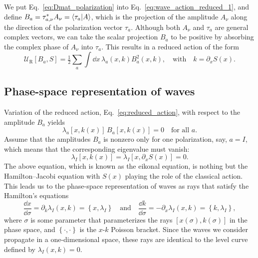 We put Eq.~\eqref{eq:Dmat_polarization} into Eq.~\eqref{eq:wave_action_reduced_1}, and define $B_{a} = \tau_{a, \nu}^{*}A_{\nu} = \mathinner{\langle{\tau_{a}|A}\rangle}$, which is the projection of the amplitude $A_{\nu}$ along the direction of the polarization vector $\tau_{a}$.
Although both $A_{\nu}$ and $\tau_{a}$ are general complex vectors, we can take the scalar projection $B_{a}$ to be positive by absorbing the complex phase of $A_{\nu}$ into $\tau_{a}$.
This results in a reduced action of the form
%
\begin{equation}
  \mathscr{U}_{\text{R}}\left[B_{a}, S\right] = \tfrac{1}{2} \sum_{a} \int \dd{x}\, \lambda_{a}(x,k) B_{a}^{2}(x, k),
  \quad\text{with}\quad
  k = \partial_{x}S(x).
  \label{eq:reduced_action}
\end{equation}

\subsection{Phase-space representation of waves}

Variation of the reduced action, Eq.~\eqref{eq:reduced_action}, with respect to the amplitude $B_{a}$ yields
%
\begin{equation}
  \lambda_{a}[x, k(x)]\,B_{a}[x, k(x)] = 0
  \quad\text{for all $a$}.
\end{equation}
%
Assume that the amplitudes $B_{a}$ is nonzero only for one polarization, say, $a = I$, which means that the corresponding eigenvalue must vanish:
%
\begin{equation}
  \lambda_{I}\left[x, k(x)\right] = \lambda_{I}\left[x, \partial_{x}S(x)\right] = 0.
  \label{eq:eikonal}
\end{equation}
%
The above equation, which is known as the eikonal equation, is nothing but the Hamilton--Jacobi equation with $S(x)$ playing the role of the classical action.
 This leads us to the phase-space representation of waves as rays that satisfy the Hamilton's equations
%
\begin{equation}
  \frac{\dd{x}}{\dd{\sigma}} = \partial_{k}\lambda_{I}(x, k) = \left\{x, \lambda_{I}\right\}
  \quad\text{and}\quad
  \frac{\dd{k}}{\dd{\sigma}} = -\partial_{x}\lambda_{I}(x, k) = \left\{k, \lambda_{I}\right\},
\end{equation}
%
where $\sigma$ is some parameter that parameterizes the rays $[x(\sigma), k(\sigma)]$ in the phase space, and $\left\{\cdot, \cdot\right\}$ is the $x$-$k$ Poisson bracket.
Since the waves we consider propagate in a one-dimensional space, these rays are identical to the level curve defined by $\lambda_{I}(x, k) = 0$.

